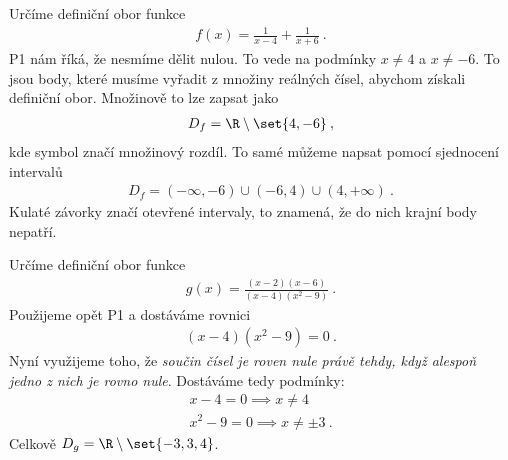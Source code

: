 \begin{example}
    Určíme definiční obor funkce \begin{align}
        f(x) = \frac{1}{x-4} + \frac{1}{x+6} \:.
    \end{align}
    P1 nám říká, že nesmíme dělit nulou. To vede na podmínky $x \neq 4$ a $x \neq -6$. To jsou body, které musíme vyřadit z množiny reálných čísel, abychom získali definiční obor. Množinově to lze zapsat jako 
    \begin{align}
        D_f = \R \setminus \set{4,-6} \:,
    \end{align}
    kde symbol \uv{$\setminus$} značí množinový rozdíl. To samé můžeme napsat pomocí sjednocení intervalů 
    \begin{align}
        D_f = (-\infty,-6) \cup (-6,4) \cup (4,+\infty) \:.
    \end{align}
    Kulaté závorky značí otevřené intervaly, to znamená, že do nich krajní body nepatří.
\end{example}


\begin{example}
    Určíme definiční obor funkce \begin{align}
        g(x) = \frac{(x-2)(x-6)}{(x-4)(x^2-9)} \:.
    \end{align}
    Použijeme opět P1 a dostáváme rovnici \begin{align}
        (x-4)(x^2-9) = 0 \:.
    \end{align}
    Nyní využijeme toho, že \textit{součin čísel je roven nule právě tehdy, když alespoň jedno z nich je rovno nule}. Dostáváme tedy podmínky:
    \begin{align}
        x - 4 = 0 \implies x \neq 4 \\
        x^2 - 9 = 0 \implies x \neq \pm 3 \:.
    \end{align}
    Celkově $D_g = \R \setminus \set{-3,3,4}$.
\end{example}

